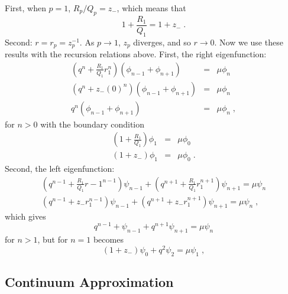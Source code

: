 \documentclass[a4paper,10pt]{article}
\begin{document}
First, when $p=1$, $R_p/Q_p = z_-$, which means that
\begin{equation}
  1 + \frac{R_1}{Q_1} = 1 + z_- \;. 
\end{equation}
Second: $r = r_p = z_p^{-1}$. As $p\to1$, $z_p$ diverges, and so $r\to 0$. Now we use these results with the recursion relations above. First, the right eigenfunction:
\begin{eqnarray}
  \left( q^n + \frac{R_1}{Q_1} r_1^n \right) \left( \phi_{n-1} + \phi_{n+1} \right) &=& \mu \phi_n \nonumber \\
  \left( q^n + z_- (0)^n \right) \left( \phi_{n-1} + \phi_{n+1} \right) &=& \mu \phi_n \nonumber \\
  q^n  \left( \phi_{n-1} + \phi_{n+1} \right) &=& \mu \phi_n \;, 
\end{eqnarray}
for $n>0$ with the boundary condition
\begin{eqnarray}
 \left( 1 + \frac{R_1}{Q_1} \right) \phi_1 &=& \mu \phi_0 \nonumber \\
 \left( 1 + z_- \right) \phi_1 &=& \mu \phi_0 \;.
\end{eqnarray}
Second, the left eigenfunction:
\begin{eqnarray}
 \left( q^{n-1} + \frac{R_1}{Q_1} r-1^{n-1} \right) \psi_{n-1} + \left( q^{n+1} + \frac{R_1}{Q_1} r_1^{n+1} \right) \psi_{n+1} = \mu \psi_n \nonumber \\
 \left( q^{n-1} + z_- r_1^{n-1} \right) \psi_{n-1} + \left( q^{n+1} + z_- r_1^{n+1} \right) \psi_{n+1} = \mu \psi_n \;, 
\end{eqnarray}
which gives
\begin{equation}
 q^{n-1} +  \psi_{n-1} + q^{n+1} \psi_{n+1} = \mu \psi_n 
\end{equation}
for $n>1$, but for $n=1$ becomes
\begin{equation}
 \left( 1 + z_- \right) \psi_{0} + q^{2} \psi_{2} = \mu \psi_1 \;, 
\end{equation}



\subsection{Continuum Approximation}
\end{document}
